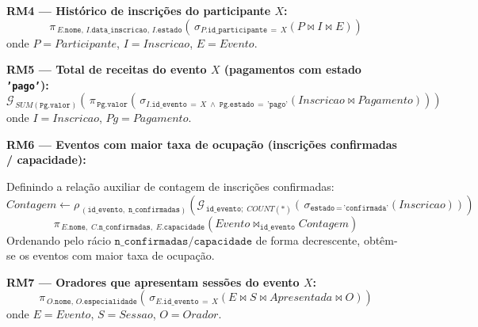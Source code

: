\documentclass[runningheads]{llncs}
\begin{document}
                \vspace{0.4cm}
                \noindent\textbf{RM4 — Histórico de inscrições do participante $X$:}
                \[
                \pi_{\,E.\texttt{nome},\,I.\texttt{data\_inscricao},\,I.\texttt{estado}}\!\left(\,\sigma_{P.\texttt{id\_participante}\,=\,X}\!\left(P \bowtie I \bowtie E\right)\right)
                \]
                onde $P = \mathit{Participante}$, $I = \mathit{Inscricao}$, $E = \mathit{Evento}$.

                \vspace{0.4cm}
                \noindent\textbf{RM5 — Total de receitas do evento $X$ (pagamentos com estado \texttt{'pago'}):}
                \[
                \mathcal{G}_{\,SUM(\texttt{Pg.valor})}\!\left(\,\pi_{\,\texttt{Pg.valor}}\!\left(\,\sigma_{I.\texttt{id\_evento}\,=\,X\;\wedge\;\texttt{Pg.estado}\,=\,\texttt{'pago'}}\!\left(\mathit{Inscricao} \bowtie \mathit{Pagamento}\right)\right)\right)
                \]
                onde $I = \mathit{Inscricao}$, $Pg = \mathit{Pagamento}$.

                \vspace{0.4cm}
                \noindent\textbf{RM6 — Eventos com maior taxa de ocupação (inscrições confirmadas / capacidade):}

                \noindent Definindo a relação auxiliar de contagem de inscrições confirmadas:
                \[
                \mathit{Contagem} \leftarrow \rho_{\,(\texttt{id\_evento},\;\texttt{n\_confirmadas})}\!\left(\mathcal{G}_{\,\texttt{id\_evento};\;COUNT(*)}\!\left(\,\sigma_{\texttt{estado}\,=\,\texttt{'confirmada'}}\!\left(\mathit{Inscricao}\right)\right)\right)
                \]
                \[
                \pi_{\,E.\texttt{nome},\;C.\texttt{n\_confirmadas},\;E.\texttt{capacidade}}\!\left(\mathit{Evento} \bowtie_{\texttt{id\_evento}} \mathit{Contagem}\right)
                \]
                \noindent Ordenando pelo rácio $\texttt{n\_confirmadas} / \texttt{capacidade}$ de forma decrescente, obtêm-se os eventos com maior taxa de ocupação.

                \vspace{0.4cm}
                \noindent\textbf{RM7 — Oradores que apresentam sessões do evento $X$:}
                \[
                \pi_{\,O.\texttt{nome},\,O.\texttt{especialidade}}\!\left(\,\sigma_{E.\texttt{id\_evento}\,=\,X}\!\left(E \bowtie S \bowtie \mathit{Apresentada} \bowtie O\right)\right)
                \]
                onde $E = \mathit{Evento}$, $S = \mathit{Sessao}$, $O = \mathit{Orador}$.
\end{document}
